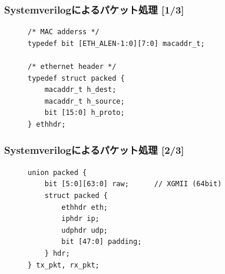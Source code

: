 \documentclass[10pt, compress]{beamer}
\begin{document}

\begin{frame}[fragile,t]
  \frametitle{Systemverilogによるパケット処理 [1/3]}

\begin{figure}
\begin{tcolorbox}[title=ethernet\_pkg.sv]
\begin{verbatim}
/* MAC adderss */
typedef bit [ETH_ALEN-1:0][7:0] macaddr_t;

/* ethernet header */
typedef struct packed {
    macaddr_t h_dest;
    macaddr_t h_source;
    bit [15:0] h_proto;
} ethhdr;
\end{verbatim}
\end{tcolorbox}
\end{figure}

\end{frame}


\begin{frame}[fragile,t]
  \frametitle{Systemverilogによるパケット処理 [2/3]}

\begin{figure}
\begin{tcolorbox}[title=user\_app.sv]
\begin{verbatim}
union packed {
    bit [5:0][63:0] raw;      // XGMII (64bit)
    struct packed {
        ethhdr eth;
        iphdr ip;
        udphdr udp;
        bit [47:0] padding;
    } hdr;
} tx_pkt, rx_pkt;
\end{verbatim}
\end{tcolorbox}
\end{figure}

\end{frame}

\end{document}
